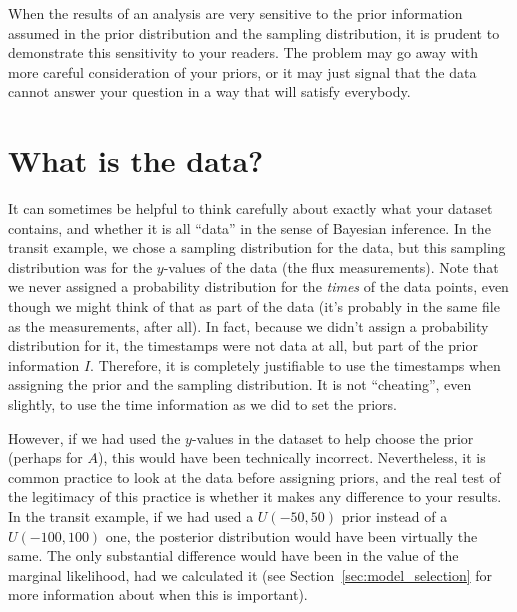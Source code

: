 When the results of an analysis are very sensitive to the prior information
assumed in the prior distribution and the sampling distribution, it is
prudent to demonstrate this sensitivity to your readers. The problem may
go away with more careful consideration of your priors, or it may just signal
that the data cannot answer your question in a way that will satisfy
everybody.

\section{What is the data?}
It can sometimes be helpful to think carefully about exactly what your dataset
contains, and whether it is all ``data'' in the sense of Bayesian inference.
In the transit example, we chose a sampling distribution for the data, but this
sampling distribution was for the $y$-values of the data
(the flux measurements). Note that we never assigned a probability distribution
for the {\it times} of the data points, even though we might think of that as
part of the data (it's probably in the same file as the measurements, after all).
In fact, because we didn't assign a probability distribution for it, the
timestamps were not data at all, but part of the prior information $I$.
Therefore, it is completely justifiable to use the timestamps when assigning
the prior and the sampling distribution. It is not ``cheating'', even slightly,
to use the time information as we did to set the priors.

However, if we had used the $y$-values in the dataset to help choose the prior
(perhaps for $A$), this would have been technically incorrect. Nevertheless,
it is common practice to look at the data before assigning priors, and the
real test of the legitimacy of this practice is whether it makes any difference
to your results. In the transit example, if we had used a $U(-50, 50)$ prior
instead of a $U(-100, 100)$ one, the posterior distribution would have been
virtually the same. The only substantial difference would have been in the
value of the marginal likelihood, had we calculated it
(see Section~\ref{sec:model_selection} for more information about when this
is important).




